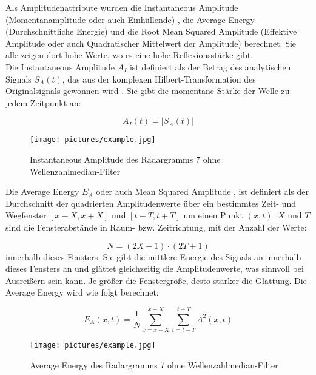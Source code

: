 Als Amplitudenattribute wurden die Instantaneous Amplitude (Momentanamplitude oder auch Einhüllende) \parencite{taner_complex_1979}, die Average Energy (Durchschnittliche Energie) \parencites{roden_geologic_2015}{noauthor_average_2021} und die Root Mean Squared Amplitude (Effektive Amplitude oder auch Quadratischer Mittelwert der Amplitude) \parencites{roden_geologic_2015}{noauthor_rms_2022} berechnet. Sie alle zeigen dort hohe Werte, wo es eine hohe Reflexionsstärke gibt. \\
Die Instantaneous Amplitude $A_I$ \parencite[S. 191]{sheriff_encyclopedic_2002} ist definiert als der Betrag des analytischen Signals $S_A(t)$, das aus der komplexen Hilbert-Transformation des Originalsignals gewonnen wird \parencite[S. 177]{sheriff_encyclopedic_2002}. Sie gibt die momentane Stärke der Welle zu jedem Zeitpunkt an:

\begin{equation}
    A_I(t) = |S_A(t)|
\end{equation}

\begin{figure}[H]
    \centering
    \texttt{[image: pictures/example.jpg]}
    \caption{Instantaneous Amplitude des Radargramms 7 ohne Wellenzahlmedian-Filter}
    \label{fig:inst_amplitude}
\end{figure}
Die Average Energy $E_A$ oder auch Mean Squared Amplitude \parencite{noauthor_average_2021}, ist definiert als der Durchschnitt der quadrierten Amplitudenwerte über ein bestimmtes Zeit- und Wegfenster $\left[x-X, x+X\right]$ und $\left[t-T, t+T\right]$ um einen Punkt $(x,t)$. $X$ und $T$ sind die Fensterabstände in Raum- bzw. Zeitrichtung, mit der Anzahl der Werte:

\begin{equation}
    N = (2X+1) \cdot (2T+1)
\end{equation}
innerhalb dieses Fensters. Sie gibt die mittlere Energie des Signals an innerhalb dieses Fensters an und glättet gleichzeitig die Amplitudenwerte, was sinnvoll bei Ausreißern sein kann. Je größer die Fenstergröße, desto stärker die Glättung. Die Average Energy wird wie folgt berechnet:

\begin{equation}
    E_A(x,t) = \frac{1}{N} \sum_{x=x-X}^{x+X} \sum_{t=t-T}^{t+T} A^2(x,t)
\end{equation}

\begin{figure}[H]
    \centering
    \texttt{[image: pictures/example.jpg]}
    \caption{Average Energy des Radargramms 7 ohne Wellenzahlmedian-Filter}
    \label{fig:average_energy}
\end{figure}

